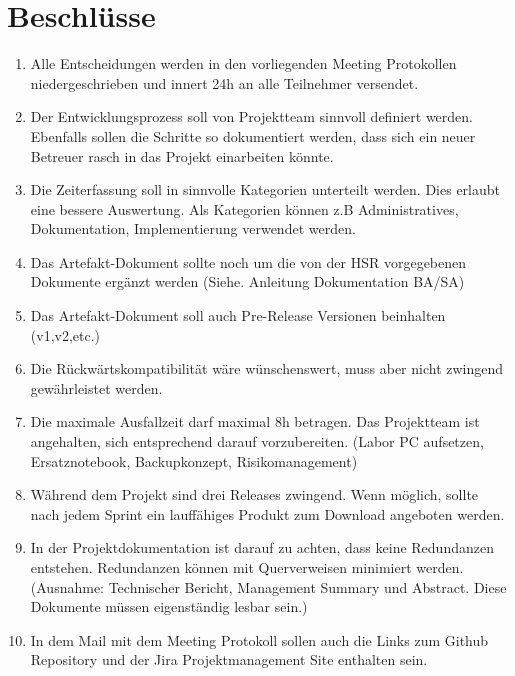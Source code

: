 \documentclass[11pt, a4paper,oneside]{scrartcl}
\begin{document}
\section{Beschlüsse}
\begin{enumerate}
	\item Alle Entscheidungen werden in den vorliegenden Meeting Protokollen niedergeschrieben und innert 24h an alle Teilnehmer versendet.
	\item Der Entwicklungsprozess soll von Projektteam sinnvoll definiert werden. Ebenfalls sollen die Schritte so dokumentiert werden, dass sich ein neuer Betreuer rasch in das Projekt einarbeiten könnte.
	\item Die Zeiterfassung soll in sinnvolle Kategorien unterteilt werden. Dies erlaubt eine bessere Auswertung. Als Kategorien können z.B Administratives, Dokumentation, Implementierung verwendet werden.
	\item Das Artefakt-Dokument sollte noch um die von der HSR vorgegebenen Dokumente ergänzt werden (Siehe. Anleitung Dokumentation BA/SA)
	\item Das Artefakt-Dokument soll auch Pre-Release Versionen beinhalten (v1,v2,etc.)
	\item Die Rückwärtskompatibilität wäre wünschenswert, muss aber nicht zwingend gewährleistet werden.
	\item Die maximale Ausfallzeit darf maximal 8h betragen. Das Projektteam ist angehalten, sich entsprechend darauf vorzubereiten. (Labor PC aufsetzen, Ersatznotebook, Backupkonzept, Risikomanagement)
	\item Während dem Projekt sind drei Releases zwingend. Wenn möglich, sollte nach jedem Sprint ein lauffähiges Produkt zum Download angeboten werden. 
	\item In der Projektdokumentation ist darauf zu achten, dass keine Redundanzen entstehen. Redundanzen können mit Querverweisen minimiert werden. (Ausnahme: Technischer Bericht, Management Summary und Abstract. Diese Dokumente müssen eigenständig lesbar sein.)
	\item In dem Mail mit dem Meeting Protokoll sollen auch die Links zum Github Repository und der Jira Projektmanagement Site enthalten sein.
\end{enumerate}
\end{document}
